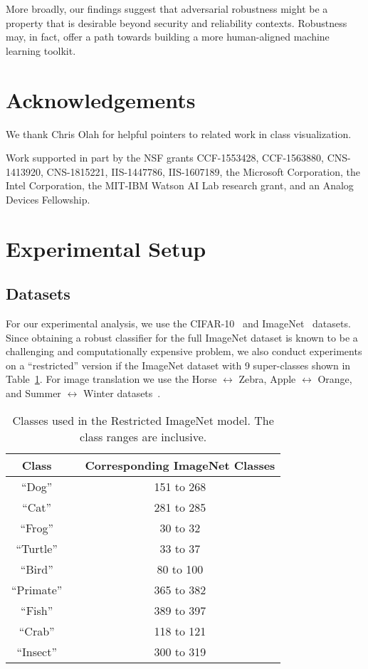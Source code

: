 \documentclass{article}
\newcommand{\HtoZ}{Horse $\leftrightarrow$ Zebra}
\newcommand{\StoW}{Summer $\leftrightarrow$ Winter}
\newcommand{\AtoO}{Apple $\leftrightarrow$ Orange}
\begin{document}
{More broadly, our findings suggest that adversarial robustness might be a
property that is desirable beyond security and reliability contexts. Robustness
may, in fact, offer a path towards building a more human-aligned machine
learning toolkit.
 
\section*{Acknowledgements}
We thank Chris Olah for helpful pointers to related work in class visualization.

Work supported in part by the NSF grants CCF-1553428, CCF-1563880,
CNS-1413920, CNS-1815221, IIS-1447786, IIS-1607189, the Microsoft Corporation, the Intel Corporation,
the MIT-IBM Watson AI Lab research grant, and an Analog Devices Fellowship.
 
\printbibliography


\clearpage

\appendix
\section{Experimental Setup}
\label{app:setup}
\subsection{Datasets}
\label{sec:dss}
For our experimental analysis, we use the CIFAR-10~\cite{krizhevsky2009learning} 
and ImageNet~\cite{russakovsky2015imagenet} datasets. Since obtaining a robust
classifier for the full ImageNet dataset is known to be a challenging and
computationally expensive problem, we also conduct experiments 
on a  ``restricted'' version if the ImageNet dataset with 9 super-classes 
shown in Table~\ref{tab:classes}. For image translation we use the
{\HtoZ}, {\AtoO}, and {\StoW} datasets~\cite{zhu2017unpaired}.

\begin{table}[!h]
	\caption{Classes used in the Restricted ImageNet model. The class ranges are
		inclusive.}
	\begin{center}
		\begin{tabular}{ccc}
			\toprule
			\textbf{Class} & \phantom{x} & \textbf{Corresponding ImageNet Classes} \\
			\midrule
			``Dog'' &&   151  to 268    \\ 
			``Cat'' &&   281  to 285    \\
			``Frog'' &&   30  to 32    \\
			``Turtle'' &&   33  to 37    \\
			``Bird'' &&   80  to 100    \\
			``Primate'' &&   365  to 382    \\
			``Fish'' &&   389  to 397    \\
			``Crab'' &&   118  to 121    \\
			``Insect'' &&   300  to 319    \\
			\bottomrule
		\end{tabular}
	\end{center}
	\label{tab:classes}
\end{table}

}
\end{document}
